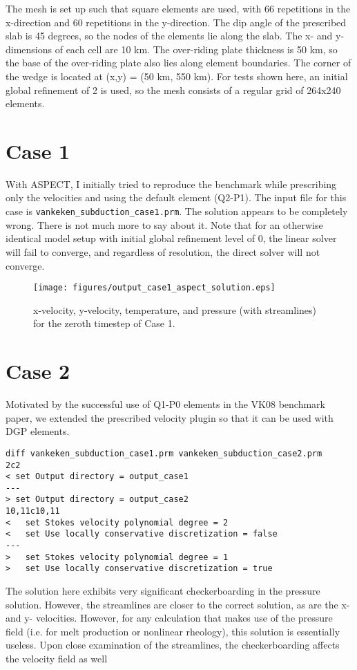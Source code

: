 \documentclass[11pt,letterpaper]{article}
\begin{document}
The mesh is set up such that square elements are used, with 66 repetitions in the x-direction and 60 repetitions in the y-direction. The dip angle of the prescribed slab is 45 degrees, so the nodes of the elements lie along the slab. The x- and y- dimensions of each cell are 10 km. The over-riding plate thickness is 50 km, so the base of the over-riding plate also lies along element boundaries. The corner of the wedge is located at (x,y) = (50 km, 550 km). For tests shown here, an initial global refinement of 2 is used, so the mesh consists of a regular grid of 264x240 elements.

\section{Case 1}
With ASPECT, I initially tried to reproduce the benchmark while prescribing only the velocities and using the default element (Q2-P1). The input file for this case is \texttt{vankeken\_subduction\_case1.prm}. The solution appears to be completely wrong. There is not much more to say about it. Note that for an otherwise identical model setup with initial global refinement level of 0, the linear solver will fail to converge, and regardless of resolution, the direct solver will not converge.

\begin{figure}
\texttt{[image: figures/output\_case1\_aspect\_solution.eps]}
\caption{x-velocity, y-velocity, temperature, and pressure (with streamlines) for the zeroth timestep of Case 1.}
\end{figure}

\section{Case 2}
Motivated by the successful use of Q1-P0 elements in the VK08 benchmark paper, we extended the prescribed velocity plugin so that it can be used with DGP elements.
\begin{verbatim}
diff vankeken_subduction_case1.prm vankeken_subduction_case2.prm
2c2
< set Output directory = output_case1
---
> set Output directory = output_case2
10,11c10,11
<   set Stokes velocity polynomial degree = 2
<   set Use locally conservative discretization = false
---
>   set Stokes velocity polynomial degree = 1
>   set Use locally conservative discretization = true

\end{verbatim}

The solution here exhibits very significant checkerboarding in the pressure solution. However, the streamlines are closer to the correct solution, as are the x- and y- velocities. However, for any calculation that makes use of the pressure field (i.e. for melt production or nonlinear rheology), this solution is essentially useless. Upon close examination of the streamlines, the checkerboarding affects the velocity field as well
\end{document}
